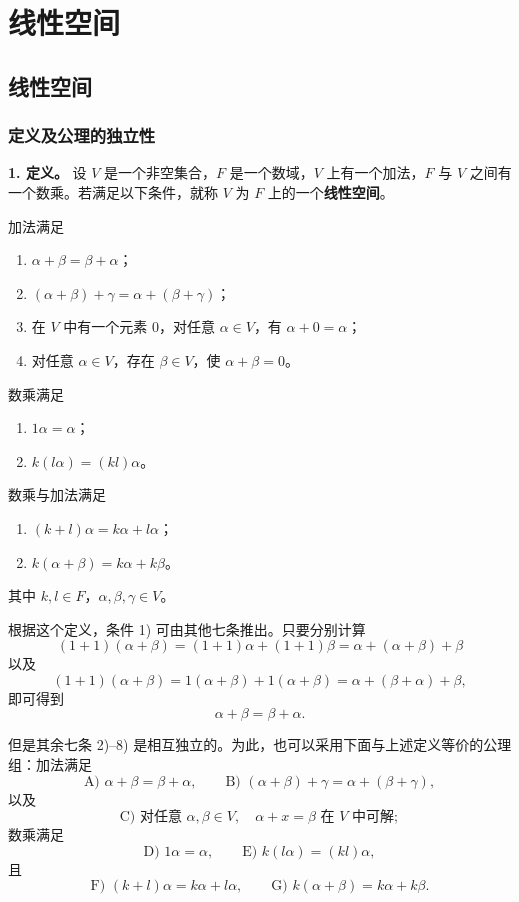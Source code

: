 \chapter{线性空间}

\section{线性空间}

\subsection{定义及公理的独立性}

\textbf{1. 定义。} 设 $V$ 是一个非空集合，$F$ 是一个数域，$V$ 上有一个加法，$F$ 与 $V$ 之间有一个数乘。若满足以下条件，就称 $V$ 为 $F$ 上的一个\textbf{线性空间}。

加法满足
\begin{enumerate}[label=\arabic*),leftmargin=2.6em,itemsep=0.35em]
\item $\alpha+\beta=\beta+\alpha$；
\item $(\alpha+\beta)+\gamma=\alpha+(\beta+\gamma)$；
\item 在 $V$ 中有一个元素 $0$，对任意 $\alpha\in V$，有 $\alpha+0=\alpha$；
\item 对任意 $\alpha\in V$，存在 $\beta\in V$，使 $\alpha+\beta=0$。
\end{enumerate}
数乘满足
\begin{enumerate}[label=\arabic*),leftmargin=2.6em,itemsep=0.35em,start=5]
\item $1\alpha=\alpha$；
\item $k(l\alpha)=(kl)\alpha$。
\end{enumerate}
数乘与加法满足
\begin{enumerate}[label=\arabic*),leftmargin=2.6em,itemsep=0.35em,start=7]
\item $(k+l)\alpha=k\alpha+l\alpha$；
\item $k(\alpha+\beta)=k\alpha+k\beta$。
\end{enumerate}
其中 $k,l\in F$，$\alpha,\beta,\gamma\in V$。

根据这个定义，条件 1) 可由其他七条推出。只要分别计算
\[
(1+1)(\alpha+\beta)
 =(1+1)\alpha+(1+1)\beta
 =\alpha+(\alpha+\beta)+\beta
\]
以及
\[
(1+1)(\alpha+\beta)
 =1(\alpha+\beta)+1(\alpha+\beta)
 =\alpha+(\beta+\alpha)+\beta,
\]
即可得到
\[
\alpha+\beta=\beta+\alpha.
\]

但是其余七条 2)--8) 是相互独立的。为此，也可以采用下面与上述定义等价的公理组：加法满足
\[
\text{A) }\alpha+\beta=\beta+\alpha,
\qquad
\text{B) }(\alpha+\beta)+\gamma=\alpha+(\beta+\gamma),
\]
以及
\[
\text{C) 对任意 }\alpha,\beta\in V,
\quad \alpha+x=\beta\text{ 在 }V\text{ 中可解};
\]
数乘满足
\[
\text{D) }1\alpha=\alpha,
\qquad
\text{E) }k(l\alpha)=(kl)\alpha,
\]
且
\[
\text{F) }(k+l)\alpha=k\alpha+l\alpha,
\qquad
\text{G) }k(\alpha+\beta)=k\alpha+k\beta.
\]


